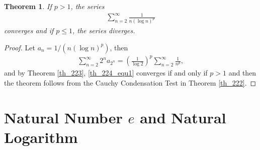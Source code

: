 \documentclass[10pt]{book}
\newtheorem{theorem}{Theorem}[chapter]
\theoremstyle{definition}
\numberwithin{equation}{chapter}
\begin{document}
\medskip

\begin{theorem}
If $p > 1$, the series
\begin{align*}
    \sum^\infty_{n=2} \frac{1}{n \left(\log n\right)^p} 
\end{align*}
converges and if $p \leq 1$, the series diverges.
\end{theorem}
\begin{proof}
Let $a_n = 1/\left(n \left(\log n\right)^p\right)$, then
\begin{align}\label{th_224_equ1}
    \sum^\infty_{n=2} 2^n a_{2^n} = \left(\frac{1}{\log 2}\right)^p \sum^\infty_{n=2} \frac{1}{n^p},
\end{align}
and by Theorem \ref{th_223}, \eqref{th_224_equ1} converges if and only if $p > 1$ and then the theorem follows from the Cauchy Condensation Test in Theorem \ref{th_222}.
\end{proof}

\medskip



\section{Natural Number $e$ and Natural Logarithm}
\end{document}
